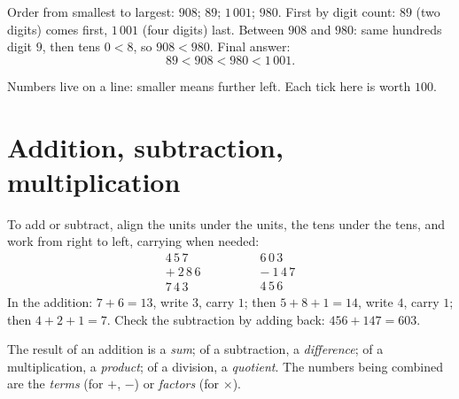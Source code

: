 \begin{example}\label{ex:g6:wholes:order}
Order from smallest to largest: $908$; $89$; $1\,001$; $980$.
First by digit count: $89$ (two digits) comes first, $1\,001$ (four
digits) last. Between $908$ and $980$: same hundreds digit $9$, then
tens $0 < 8$, so $908 < 980$. Final answer:
\[
89 < 908 < 980 < 1\,001 .
\]
\end{example}

\begin{omfigure}

{\small Numbers live on a line: smaller means further left. Each tick
here is worth $100$.}
\end{omfigure}

\section{Addition, subtraction, multiplication}

\begin{example}\label{ex:g6:wholes:columns}
To add or subtract, align the units under the units, the tens under the
tens, and work from right to left, carrying when needed:
\[
\begin{array}{r}
4\,5\,7 \\
+\ 2\,8\,6 \\
\hline
7\,4\,3
\end{array}
\qquad\qquad
\begin{array}{r}
6\,0\,3 \\
-\ 1\,4\,7 \\
\hline
4\,5\,6
\end{array}
\]
In the addition: $7 + 6 = 13$, write $3$, carry $1$; then
$5 + 8 + 1 = 14$, write $4$, carry $1$; then $4 + 2 + 1 = 7$.
Check the subtraction by adding back: $456 + 147 = 603$.
\end{example}

\begin{remark}[Vocabulary]
The result of an addition is a \emph{sum}; of a subtraction,
a \emph{difference}; of a multiplication, a
\emph{product}; of a division, a
\emph{quotient}. The numbers being combined are the
\emph{terms} (for $+$, $-$) or \emph{factors} (for $\times$).
\end{remark}

